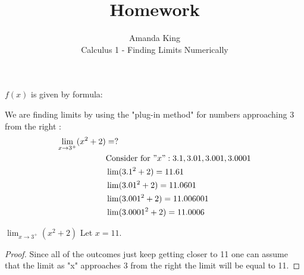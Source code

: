 \documentclass[12pt]{article}
\newenvironment{exercise}[2][Exercise]{\begin{trivlist}
\item[\hskip \labelsep {\bfseries #1}\hskip \labelsep {\bfseries #2.}]}{\end{trivlist}}
\newenvironment{proposition}[2][Proposition]{\begin{trivlist}
\item[\hskip \labelsep {\bfseries #1}\hskip \labelsep {\bfseries #2.}]}{\end{trivlist}}
\begin{document}
 
 
 
\title{Homework}%
\author{Amanda King\\ %
Calculus 1 - Finding Limits Numerically} %
 
\maketitle
 
\begin{exercise}{1} %
$f(x)$ is given by formula: 
\end{exercise}
 
\begin{exercise}
1We are finding limits by using the "plug-in method" for numbers approaching 3 from the right :
\begin{align*}
\lim_{x \to 3^+} (x^2+2) &= ?  \\
&  \text{Consider for }"x":  3.1,
               3.01,
               3.001,
               3.0001\text{} \\
& \lim(3.1^2+2)=11.61\\
& \lim(3.01^2+2)=11.0601\\
& \lim(3.001^2+2)=11.006001 \\
& \lim(3.0001^2+2)=11.0006
\end{align*}
\end{exercise}
 
\begin{proposition}{}
$\lim_{x \to 3^+} (x^2+2)$
Let $x=11$. 
\end{proposition}
 
\begin{proof}%
Since all of the outcomes just keep getting closer to 11 one can assume that the limit as "x" approaches 3 from the right the limit will be equal to 11.
%
% 
%
\end{proof}
 
 
\end{document}
